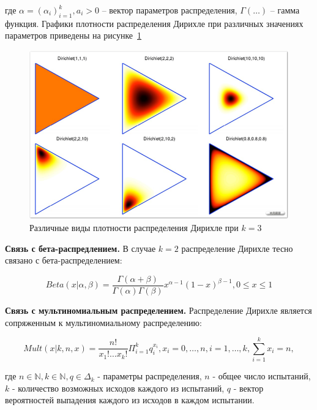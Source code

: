 \documentclass[a4paper,12pt,preview]{report} %
\begin{document}
	где $\alpha = (\alpha_i)_{i=1}^k, a_i > 0$ -- вектор параметров распределения, $\Gamma(\dots)$ -- гамма функция. Графики плотности распределения Дирихле при различных значениях параметров приведены на рисунке~\ref{fig:derihlet}
	
	\begin{figure}[H]
		\centering\includegraphics[scale=0.8]{derihlet.PNG}
		\caption{Различные виды плотности распределения Дирихле при $k = 3$}
		\label{fig:derihlet}
	\end{figure}
	
	
	\textbf{Связь с бета-распредлением.} В случае $k = 2$ распределение Дирихле тесно связано с бета-распределением:
	
	\begin{equation}
	Beta(x | \alpha, \beta) = \frac{\Gamma(\alpha + \beta)}{\Gamma(\alpha) \Gamma(\beta)} x^{\alpha - 1} (1-x)^{\beta - 1}, 0 \leq x \leq 1
	\end{equation}
	
	\textbf{Связь с мультиномиальным распределением.} Распределение Дирихле является сопряженным к мультиномиальному распределению:
	
	\begin{equation}
	Mult(x | k, n, x) = \frac{n!}{x_1! \dots x_k!} \Pi_{i=1}^k q_i^{x_i}, x_i = 0, \dots, n, i = 1, \dots, k, \sum_{i=1}^k x_i = n,
	\end{equation}
	
	где $n \in \mathbb{N}, k \in \mathbb{N}, q \in \Delta_k$ - параметры распределения, $n$ - общее число испытаний, $k$ - количество возможных исходов каждого из испытаний, $q$ - вектор вероятностей выпадения каждого из исходов в каждом испытании.
	
	
		
\end{document}
